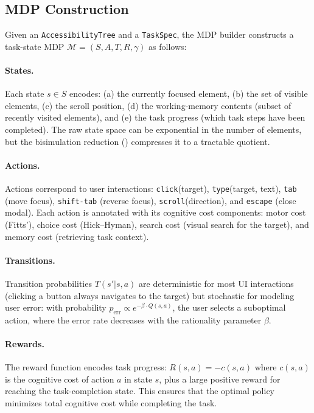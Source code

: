 \documentclass[11pt,twocolumn]{article}
\theoremstyle{definition}
\newcommand{\mdp}{\mathcal{M}}
\begin{document}
\subsection{MDP Construction}
\label{sec:mdp}

Given an \texttt{AccessibilityTree} and a \texttt{TaskSpec}, the MDP builder constructs a task-state MDP $\mdp = (S, A, T, R, \gamma)$ as follows:

\paragraph{States.}
Each state $s \in S$ encodes: (a) the currently focused element, (b) the set of visible elements, (c) the scroll position, (d) the working-memory contents (subset of recently visited elements), and (e) the task progress (which task steps have been completed).
The raw state space can be exponential in the number of elements, but the bisimulation reduction () compresses it to a tractable quotient.

\paragraph{Actions.}
Actions correspond to user interactions: \texttt{click}(target), \texttt{type}(target, text), \texttt{tab} (move focus), \texttt{shift-tab} (reverse focus), \texttt{scroll}(direction), and \texttt{escape} (close modal).
Each action is annotated with its cognitive cost components: motor cost (Fitts'), choice cost (Hick--Hyman), search cost (visual search for the target), and memory cost (retrieving task context).

\paragraph{Transitions.}
Transition probabilities $T(s'|s,a)$ are deterministic for most UI interactions (clicking a button always navigates to the target) but stochastic for modeling user error: with probability $p_{\text{err}} \propto e^{-\beta \cdot Q(s,a)}$, the user selects a suboptimal action, where the error rate decreases with the rationality parameter $\beta$.

\paragraph{Rewards.}
The reward function encodes task progress: $R(s, a) = -c(s, a)$ where $c(s, a)$ is the cognitive cost of action $a$ in state $s$, plus a large positive reward for reaching the task-completion state.
This ensures that the optimal policy minimizes total cognitive cost while completing the task.
\end{document}
